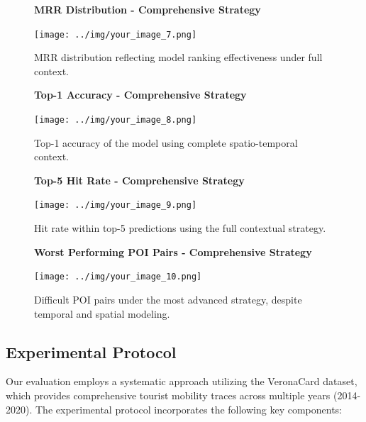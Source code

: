 \documentclass[12pt,a4paper]{article}
\begin{document}
\begin{enumerate}
\begin{figure}[H]
\centering
\textbf{MRR Distribution - Comprehensive Strategy}\par
\vspace{0.5em}
\texttt{[image: ../img/your\_image\_7.png]}
\caption{MRR distribution reflecting model ranking effectiveness under full context.}
\label{fig:comprehensive_mrr}
\end{figure}

\begin{figure}[H]
\centering
\textbf{Top-1 Accuracy - Comprehensive Strategy}\par
\vspace{0.5em}
\texttt{[image: ../img/your\_image\_8.png]}
\caption{Top-1 accuracy of the model using complete spatio-temporal context.}
\label{fig:comprehensive_top1}
\end{figure}

\begin{figure}[H]
\centering
\textbf{Top-5 Hit Rate - Comprehensive Strategy}\par
\vspace{0.5em}
\texttt{[image: ../img/your\_image\_9.png]}
\caption{Hit rate within top-5 predictions using the full contextual strategy.}
\label{fig:comprehensive_top5}
\end{figure}

\begin{figure}[H]
\centering
\textbf{Worst Performing POI Pairs - Comprehensive Strategy}\par
\vspace{0.5em}
\texttt{[image: ../img/your\_image\_10.png]}
\caption{Difficult POI pairs under the most advanced strategy, despite temporal and spatial modeling.}
\label{fig:comprehensive_worst_pairs}
\end{figure}

\end{enumerate}


\subsection{Experimental Protocol}

Our evaluation employs a systematic approach utilizing the VeronaCard dataset, which provides comprehensive tourist mobility traces across multiple years (2014-2020). The experimental protocol incorporates the following key components:
\end{document}

